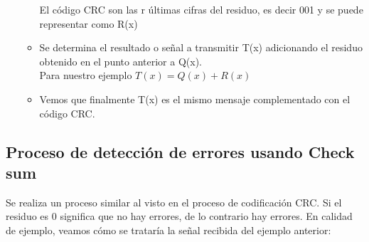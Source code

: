 \begin{itemize}
\begin{itemize}
El código CRC son las r últimas cifras del residuo, es decir 001 y se puede representar como R(x)
    \item Se determina el resultado o señal a transmitir T(x) adicionando el residuo obtenido en el punto anterior a Q(x). \\
    Para nuestro ejemplo $T(x) = Q(x)+R(x) $
    
    \begin{table}[h!]
	\centering
    \end{table}
   \item Vemos que finalmente T(x) es el mismo mensaje complementado con el código CRC.
    \end{itemize}
\end{itemize}

\subsection{Proceso de detección de errores usando Check sum}

Se realiza un proceso similar al visto en el proceso de codificación CRC. Si el residuo es 0 significa que no hay errores, de lo contrario hay errores. En calidad de ejemplo, veamos cómo se trataría la señal recibida del ejemplo anterior:


\begin{table}[h!]
	\centering
\end{table}

